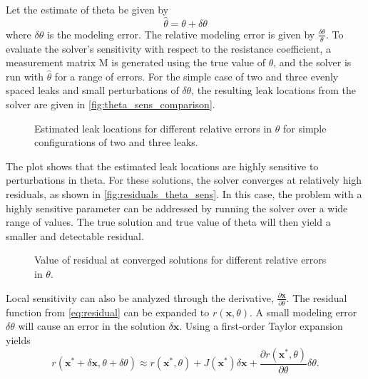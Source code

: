 Let the estimate of \gls{theta} be given by 
\begin{equation*}
    \hat{\theta} = \theta + \delta\theta
\end{equation*}
where $\delta\theta$ is the modeling error. The relative modeling error is given by $\frac{\delta\theta}{\theta}$. To evaluate the solver's sensitivity with respect to the resistance coefficient, a measurement matrix \gls{M} is generated using the true value of $\theta$, and the solver is run with $\hat\theta$ for a range of errors. For the simple case of two and three evenly spaced leaks and small perturbations of $\delta\theta$, the resulting leak locations from the solver are given in \autoref{fig:theta_sens_comparison}.

\begin{figure}[h]
    \centering
    
    \caption[Estimated leak locations for relative errors in $\theta$]{Estimated leak locations for different relative errors in $\theta$ for simple configurations of two and three leaks.}
    \label{fig:theta_sens_comparison}
\end{figure}

\FloatBarrier

The plot shows that the estimated leak locations are highly sensitive to perturbations in \gls{theta}. For these solutions, the solver converges at relatively high residuals, as shown in \autoref{fig:residuals_theta_sens}. In this case, the problem with a highly sensitive parameter can be addressed by running the solver over a wide range of values. The true solution and true value of \gls{theta} will then yield a smaller and detectable residual. \\

\begin{figure}[ht]
    \centering
    
    \caption[Residual value at solutions for relative errors in $\theta$]{Value of residual at converged solutions for different relative errors in $\theta$.}
    \label{fig:residuals_theta_sens}
\end{figure}

Local sensitivity can also be analyzed through the derivative, $\frac{\partial \mathbf{x}}{\partial \theta}$. The residual function from \cref{eq:residual} can be expanded to $r(\mathbf{x},\theta)$. A small modeling error $\delta\theta$ will cause an error in the solution $\delta\mathbf{x}$. Using a first-order Taylor expansion yields
\begin{equation*}
r(\mathbf{x}^\ast+\delta \mathbf{x},\theta+\delta\theta)
\approx
r(\mathbf{x}^\ast,\theta)
+
J(\mathbf{x}^\ast) \delta \mathbf{x}
+
\dfrac{\partial r(\mathbf{x}^\ast,\theta)}{\partial \theta} \delta\theta.
\end{equation*}

